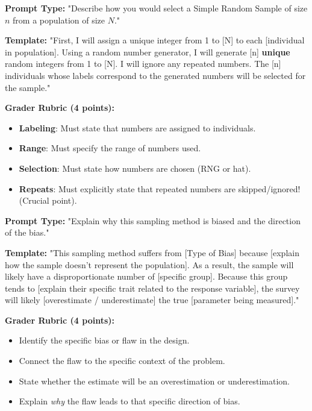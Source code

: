 \begin{frqrubricbox}
\textbf{Prompt Type:} "Describe how you would select a Simple Random Sample of size $n$ from a population of size $N$."

\textbf{Template:}
"First, I will assign a unique integer from 1 to [N] to each [individual in population]. Using a random number generator, I will generate [n] \textbf{unique} random integers from 1 to [N]. I will ignore any repeated numbers. The [n] individuals whose labels correspond to the generated numbers will be selected for the sample."

\textbf{Grader Rubric (4 points):}
\begin{itemize}
    \item \textbf{Labeling}: Must state that numbers are assigned to individuals.
    \item \textbf{Range}: Must specify the range of numbers used.
    \item \textbf{Selection}: Must state how numbers are chosen (RNG or hat).
    \item \textbf{Repeats}: Must explicitly state that repeated numbers are skipped/ignored! (Crucial point).
\end{itemize}
\end{frqrubricbox}

\begin{frqrubricbox}
\textbf{Prompt Type:} "Explain why this sampling method is biased and the direction of the bias."

\textbf{Template:}
"This sampling method suffers from [Type of Bias] because [explain how the sample doesn't represent the population]. As a result, the sample will likely have a disproportionate number of [specific group]. Because this group tends to [explain their specific trait related to the response variable], the survey will likely [overestimate / underestimate] the true [parameter being measured]."

\textbf{Grader Rubric (4 points):}
\begin{itemize}
    \item Identify the specific bias or flaw in the design.
    \item Connect the flaw to the specific context of the problem.
    \item State whether the estimate will be an overestimation or underestimation.
    \item Explain \textit{why} the flaw leads to that specific direction of bias.
\end{itemize}
\end{frqrubricbox}

